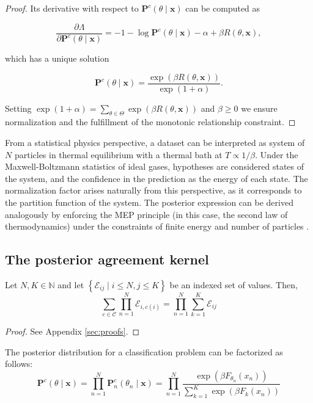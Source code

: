 \begin{proof}
    Its derivative with respect to $\mathbf{P}^c(\theta \mid \bm{x})$ can be computed as

    $$
    \frac{\partial \Lambda}{\partial \mathbf{P}^c(\theta \mid \bm{x})} = -1 - \log \mathbf{P}^c(\theta \mid \bm{x}) - \alpha + \beta R(\theta, \bm{x}),
    $$

    which has a unique solution

    $$
    \mathbf{P}^c(\theta \mid \bm{x}) = \frac{\exp \left ( \beta R(\theta, \bm{x}) \right )}{\exp \left ( 1+ \alpha \right )}.
    $$

    Setting $\exp \left ( 1+ \alpha \right ) = \sum_{\theta \in \Theta} \exp \left ( \beta R(\theta, \bm{x}) \right )$ and $\beta \geq 0$ 
    we ensure normalization and the fulfillment of the monotonic relationship constraint.
\end{proof}

From a statistical physics perspective, a dataset can be interpreted as system of 
$N$ particles in thermal equilibrium with a thermal bath at $T \propto 1/\beta$. 
Under the Maxwell-Boltzmann statistics of ideal gases, hypotheses are considered 
states of the system, and the confidence in the prediction as the energy of each state. 
The normalization factor arises naturally from this perspective, as it corresponds to 
the partition function of the system. The posterior expression can be derived analogously 
by enforcing the MEP principle (in this case, the second law of thermodynamics) under 
the constraints of finite energy and number of particles
\cite{bovierStatisticalMechanicsDisordered2012}.

\subsection{The posterior agreement kernel}\label{sec:pa_kernel}

\begin{lemma}\label{lemma:exchangeability} 
    Let $N, K \in \mathbb{N}$ and let $\left\{\mathcal{E}_{i j} \mid i \leq N, j \leq K\right\}$ be an indexed set of values. Then,
    $$
    \sum_{c \in \mathcal{C}} \prod_{n=1}^N \mathcal{E}_{i, c(i)}=\prod_{n=1}^N \sum_{k=1}^K \mathcal{E}_{i j}
    $$
\end{lemma}

\begin{proof}
    See Appendix \ref{sec:proofs}.
\end{proof}

\begin{lemma}\label{theorem:posterior_factorization}

    The posterior distribution for a classification problem can be factorized as follows:
    $$
    \mathbf{P}^c(\theta \mid \bm{x}) = \prod_{n=1}^N  \mathbf{P}_n^c(\theta_n \mid \bm{x}) = \prod_{n=1}^N \frac{\exp \left ( \beta F_{\theta_n}(x_n) \right )}{\sum_{k=1}^K \exp \left ( \beta F_k(x_n) \right )}
    $$
\end{lemma}

